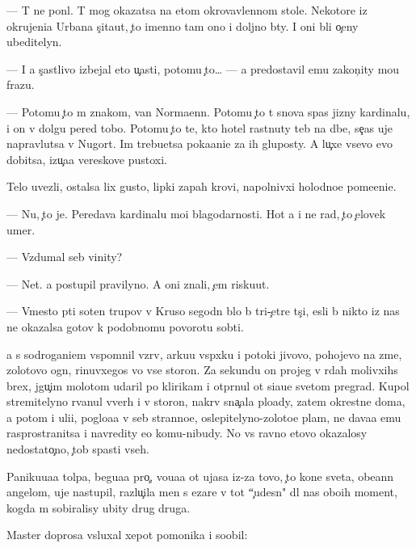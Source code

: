 \documentclass[10pt]{book}
\begin{document}
— T{\yi} ne pon{\ia}l. T{\yi} mog okazatsa na etom okrovavlennom stole. Nekotor{\yi}{\y}e iz okrujeni{\y}a Urbana s{\c}ita{\y}ut, {\c}to imenno tam ono i doljno b{\yi}ty. I oni b{\yi}li o{\c}eny ubeditelyn{\yi}.

— I {\y}a s{\c}astlivo izbejal eto{\y} u{\c}asti, potomu {\c}to… — {\Y}a predostavil {\y}emu zakon{\c}ity mo{\y}u frazu.

— Potomu {\c}to m{\yi} znakom{\yi}, van Norma{\y}enn. Potomu {\c}to t{\yi} snova spas jizny kardinalu, i on v dolgu pered tobo{\y}. Potomu {\c}to te, kto hotel rast{\ia}nuty teb{\ia} na d{\yi}be, se{\y}{\c}as uje napravl{\ia}{\y}utsa v N{\y}ugort. Im trebu{\y}etsa poka{\y}ani{\y}e za ih gluposty. A lu{\c}xe vsevo {\y}evo dobitsa, izu{\c}a{\y}a vereskov{\yi}{\y}e pustoxi.

Telo uvezli, ostalsa lix gusto{\y}, lipki{\y} zapah krovi, napolnivxi{\y} holodno{\y}e pome{\x}eni{\y}e.

— Nu, {\c}to je. Peredava{\y} kardinalu mo{\y}i blagodarnosti. Hot{\ia} {\y}a i ne rad, {\c}to {\c}elovek umer.

— Vzdumal seb{\ia} vinity?

— Net. {\Y}a postupil pravilyno. A oni znali, {\c}em risku{\y}ut.

— Vmesto p{\ia}ti soten trupov v Kruso segodn{\ia} b{\yi}lo b{\yi} tri-{\c}et{\yi}re t{\yi}s{\ia}{\c}i, {\y}esli b{\yi} nikto iz nas ne okazalsa gotov k podobnomu povorotu sob{\yi}ti{\y}.

{\Y}a s sodrogani{\y}em vspomnil vzr{\yi}v, {\y}arku{\y}u vsp{\yi}xku i potoki jivovo, pohojevo na zme{\y}, zolotovo ogn{\ia}, rinuvxegos{\ia} vo vse storon{\yi}. Za sekundu on projeg v r{\ia}dah molivxihs{\ia} brex, jgu{\c}im molotom udaril po klirikam i otpr{\ia}nul ot si{\y}a{\y}u{\x}e{\y} svetom pregrad{\yi}. Kupol stremitelyno rvanul vverh i v storon{\yi}, nakr{\yi}v sna{\c}ala plo{\x}ady, zatem okrestn{\yi}{\y}e doma, a potom i uli{\q}i, poglo{\x}a{\y}a v seb{\ia} stranno{\y}e, oslepitelyno-zoloto{\y}e plam{\ia}, ne dava{\y}a {\y}emu rasprostranitsa i navredity {\y}e{\x}o komu-nibudy. No vs{\e} ravno etovo okazalosy nedostato{\c}no, {\c}tob{\yi} spasti vseh.

Paniku{\y}u{\x}a{\y}a tolpa, begu{\x}a{\y}a pro{\c}, vo{\y}u{\x}a{\y}a ot ujasa iz-za tovo, {\c}to kone{\q} sveta, obe{\x}ann{\yi}{\y} angelom, uje nastupil, razlu{\c}ila men{\ia} s {\C}ezare v tot ``{\c}udesn{\yi}{\y}" dl{\ia} nas obo{\y}ih moment, kogda m{\yi} sobiralisy ubity drug druga.

Master doprosa v{\yi}sluxal xepot pomo{\x}nika i soob{\x}il:
\end{document}
